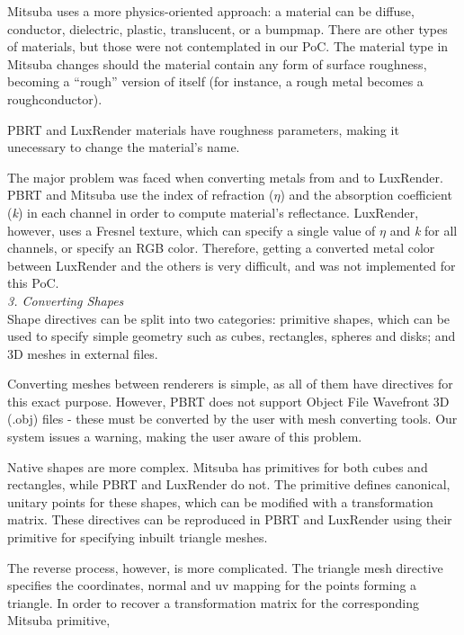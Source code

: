 Mitsuba uses a more physics-oriented approach: a material can be diffuse,
conductor, dielectric, plastic, translucent, or a bumpmap.
There are other types of materials, but those were not contemplated in our PoC.
The material type in Mitsuba changes should the material contain any form of
surface roughness, becoming a ``rough'' version of itself (for instance, a rough
metal becomes a roughconductor).

PBRT and LuxRender materials have roughness parameters, making it unecessary to
change the material's name.

The major problem was faced when converting metals from and to LuxRender. PBRT 
and Mitsuba use the index of refraction ($\eta$) and the absorption 
coefficient (\textit{k}) in each channel in order to compute material's 
reflectance. LuxRender, however, uses a Fresnel texture, which can specify a 
single value of $\eta$ and \textit{k} for all channels, or specify an RGB 
color. Therefore, getting a converted metal color between LuxRender and the 
others is very difficult, and was not implemented for this PoC. \\

\textit{3. Converting Shapes} \\
Shape directives can be split into two categories: primitive shapes, which can
be used to specify simple geometry such as cubes, rectangles, spheres and disks;
and 3D meshes in external files.

Converting meshes between renderers is simple, as all of them have directives
for this exact purpose. However, PBRT does not support Object File Wavefront 3D
(.obj) files - these must be converted by the user with mesh converting tools.
Our system issues a warning, making the user aware of this problem.

Native shapes are more complex. Mitsuba has primitives for both cubes and
rectangles, while PBRT and LuxRender do not. The primitive defines canonical,
unitary points for these shapes, which can be modified with a transformation
matrix. These directives can be reproduced in PBRT and LuxRender using their
primitive for specifying inbuilt triangle meshes.

The reverse process, however, is more complicated. The triangle mesh directive
specifies the coordinates, normal and uv mapping for the points forming a
triangle. In order to recover a transformation matrix for the corresponding
Mitsuba primitive, 

